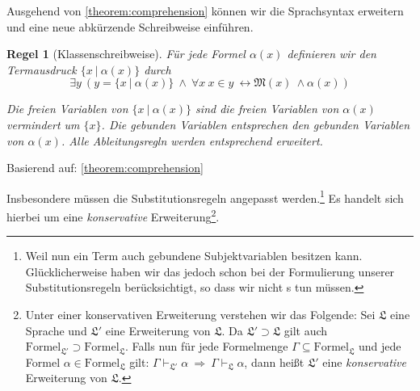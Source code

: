 \documentclass[a4paper,german,10pt,twoside]{book}
\newtheorem{rul}{Regel}
\theoremstyle{definition}
\theoremstyle{remark}
\begin{document}
\par
Ausgehend von \ref{theorem:comprehension} k{\"o}nnen wir die Sprachsyntax erweitern und eine neue abk{\"u}rzende Schreibweise einf{\"u}hren.

\begin{rul}[Klassenschreibweise]
\label{rule:classDefinition} \hypertarget{rule:classDefinition}{}
F{\"u}r jede Formel $\alpha(x)$ definieren wir den Termausdruck $\{ x \ | \ \alpha(x)\}$ durch 
$$
  \exists y \ (y = \{x \ | \ \alpha(x) \} \ \land \ \forall x \ x \in y \ \leftrightarrow \mathfrak{M}(x) \ \land \alpha(x))
$$

\par
Die freien Variablen von $\{ x \ | \ \alpha(x)\}$ sind die freien Variablen von $\alpha(x)$ vermindert um $\{ x \}$. Die gebunden Variablen entsprechen den gebunden Variablen von $\alpha(x)$. Alle Ableitungsregln werden entsprechend erweitert.
                
\end{rul}
Basierend auf: 
 \ref{theorem:comprehension}

Insbesondere m{\"u}ssen die Substitutionsregeln angepasst werden.\footnote{Weil nun ein Term auch gebundene Subjektvariablen besitzen kann. Gl{\"u}cklicherweise haben wir das jedoch schon bei der Formulierung unserer Substitutionsregeln ber{\"u}cksichtigt, so dass wir nicht s tun m{\"u}ssen.} Es handelt sich hierbei um eine \emph{konservative} Erweiterung\footnote{Unter einer konservativen Erweiterung  verstehen wir das Folgende: Sei $\mathfrak{L}$ eine Sprache und $\mathfrak{L'}$ eine Erweiterung von $\mathfrak{L}$. Da $\mathfrak{L'} \supset \mathfrak{L}$ gilt auch $\mbox{Formel}_\mathfrak{L'} \supset \mbox{Formel}_\mathfrak{L}$. Falls nun f{\"u}r jede Formelmenge $\Gamma \subseteq \mbox{Formel}_\mathfrak{L}$ und jede Formel $\alpha \in \mbox{Formel}_\mathfrak{L}$ gilt: $\Gamma \vdash_\mathfrak{L'} \alpha \ \Rightarrow \ \Gamma \vdash_\mathfrak{L} \alpha$, dann hei{\ss}t $\mathfrak{L'}$ eine \emph{konservative} Erweiterung von $\mathfrak{L}$.}.
\end{document}
